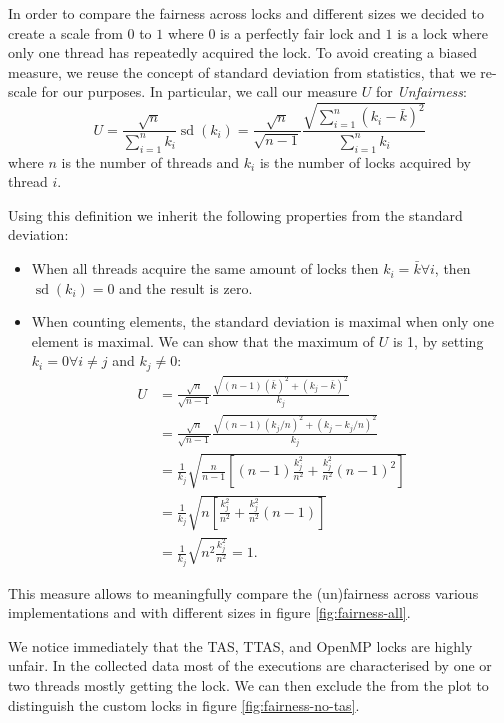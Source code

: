 In order to compare the fairness across locks and different sizes we decided to
create a scale from $0$ to $1$ where $0$ is a perfectly fair lock and $1$ is a
lock where only one thread has repeatedly acquired the lock.
To avoid creating a biased measure, we reuse the concept of standard deviation
from statistics, that we re-scale for our purposes.
In particular, we call our measure $U$ for \textit{Unfairness}:
$$
  U = \frac{\sqrt{n}}{\sum_{i = 1}^{n} k_i} \operatorname{sd}(k_i)
    = \frac{\sqrt{n}}{\sqrt{n-1}} \frac{\sqrt{\sum_{i = 1}^{n} (k_i - \bar{k})^2}}{\sum_{i = 1}^{n} k_i}
$$
where $n$ is the number of threads and $k_i$ is the number of locks acquired by thread $i$.

Using this definition we inherit the following properties from the standard deviation:
\begin{itemize}
  \item When all threads acquire the same amount of locks then
    $k_i = \bar{k} \forall i$, then $\operatorname{sd}(k_i) = 0 $ and the result
    is zero.
  \item When counting elements, the standard deviation is maximal when only one
    element is maximal.
    We can show that the maximum of $U$ is 1, by setting $k_i = 0 \forall i \neq j$ and $k_j \neq 0$:
    \begin{align*}
      U &= \frac{\sqrt{n}}{\sqrt{n-1}} \frac{\sqrt{(n-1)(\bar{k})^2 + (k_j - \bar{k})^2}}{k_j} \\
        &= \frac{\sqrt{n}}{\sqrt{n-1}} \frac{\sqrt{(n-1)(k_j/n)^2 + (k_j - k_j/n)^2}}{k_j} \\
        &= \frac{1}{k_j} \sqrt{\frac{n}{n-1} \left[(n-1)\frac{k_j^2}{n^2} + \frac{k_j^2}{n^2}(n - 1)^2 \right]} \\
        &= \frac{1}{k_j} \sqrt{n \left[\frac{k_j^2}{n^2} + \frac{k_j^2}{n^2}(n - 1) \right]} \\
        &= \frac{1}{k_j} \sqrt{n^2\frac{k_j^2}{n^2}} = 1.
    \end{align*}
\end{itemize}

This measure allows to meaningfully compare the (un)fairness across
various implementations and with different sizes in figure \ref{fig:fairness-all}.

We notice immediately that the TAS, TTAS, and OpenMP locks are highly unfair.
In the collected data most of the executions are characterised by one or two
threads mostly getting the lock.
We can then exclude the from the plot to distinguish
the custom locks in figure \ref{fig:fairness-no-tas}.

